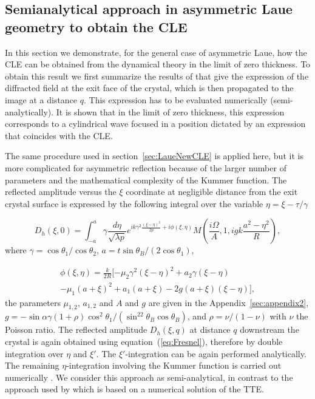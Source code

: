 \documentclass[preprint]{iucr}              %
\newcommand{\inblue}[1]{{\color{black}#1}}
\begin{document}
\subsection{Semianalytical approach in asymmetric Laue geometry \inblue{to obtain the CLE}}
\label{sec:LaueCompatibilityCLE}

\inblue{In this section we demonstrate, for the general case of asymmetric Laue, how the CLE can be obtained from the dynamical theory in the limit of zero thickness. To obtain this result we first summarize the results of \cite{GuigayFerrero2016} that give the expression of the diffracted field at the exit face of the crystal, which is then propagated to the image at a distance $q$. This expression has to be evaluated numerically (semi-analytically). It is shown that in the limit of zero thickness, this expression corresponds to a cylindrical wave focused in a position dictated by an expression that coincides with the CLE.}

The same procedure used in section~\ref{sec:LaueNewCLE} is applied here, but it is more complicated for asymmetric reflection because of the larger number of parameters and the mathematical complexity of the Kummer function. The reflected amplitude versus the $\xi$ coordinate at negligible distance from the exit crystal surface is expressed by the following integral over the variable $\eta=\xi-\tau/\gamma$

\begin{equation}
\label{eq:unpropagatedkummer}
    D_h(\xi,0) = 
    \int_{-a}^{a} \gamma\frac{d\eta}{\sqrt{\lambda p}}
    e^{i k \gamma^2
    \frac{(\xi-\eta)^2}{2p}+i \phi(\xi,\eta)
    }
     M(\frac{i\Omega}{A},1,i g k \frac{a^2-\eta^2}{R}),
\end{equation}
where $\gamma=\cos\theta_1/\cos\theta_2$, $a=t \sin\theta_B/(2\cos\theta_1)$,


\begin{multline}
    \phi(\xi,\eta) =\frac{k}{2R}[-\mu_2\gamma^2(\xi-\eta)^2
    +a_2\gamma(\xi-\eta) \\
    -\mu_1(a+\xi)^2 
    +a_1(a+\xi)
    -2g(a+\xi)(\xi-\eta)],
\end{multline}
the parameters $\mu_{1,2}$, $a_{1,2}$ and $A$ and $g$ are given in the Appendix~\ref{sec:appendix2}, $g=-\sin\alpha \gamma (1+\rho)\cos^2\theta_1/(\sin^22\theta_B\cos\theta_B)$, and $\rho=\nu/(1-\nu)$ with $\nu$ the Poisson ratio.   
The reflected amplitude $D_h(\xi,q)$ at distance $q$ downstream the crystal is again obtained using equation~(\ref{eq:Fresnel}), therefore by double integration over $\eta$ and $\xi'$. The $\xi'$-integration can be again performed analytically. The remaining $\eta$-integration involving the Kummer function is carried out numerically \cite{GuigayFerrero2016}. We consider this approach as semi-analytical, in contrast to the approach used by \cite{Nesterets} which is based on a numerical solution of the TTE.
\end{document}
